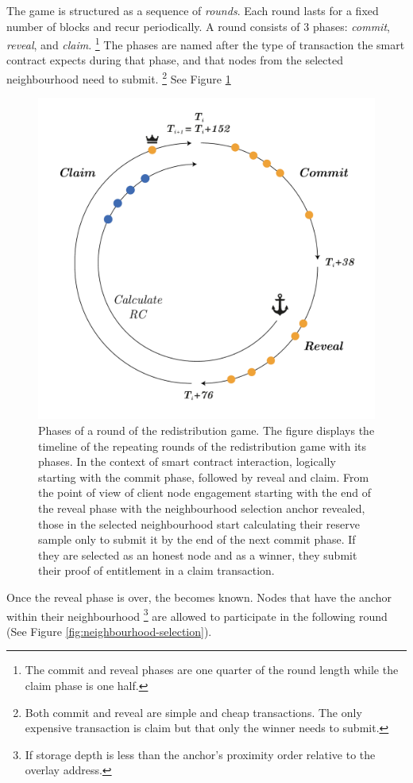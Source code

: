 The game is structured as a sequence of \emph{rounds}. Each round lasts for a fixed number of blocks and recur periodically. A round consists of 3 phases: \emph{commit}, \emph{reveal}, and \emph{claim}.%
%
\footnote{The commit and reveal phases are one quarter of the round length while the claim phase is one half.
}
%
The phases are named after the type of transaction the smart contract expects during that phase, and that nodes from the selected neighbourhood need to submit.%
%
\footnote{Both commit and reveal are simple and cheap transactions. The only expensive transaction is claim but that only the winner needs to submit.}
%
See Figure \ref{fig:phases}

\begin{figure}[!ht]
  \centering
    \includegraphics[width=.5\textwidth]{fig/round-lifecycle.pdf}
  \caption[Phases of a round of the redistribution game]{Phases of a round of the redistribution game. The figure displays the timeline of the repeating rounds of the redistribution game with its phases. In the context of smart contract interaction, logically starting with the commit phase, followed by reveal and claim. From the point of view of client node engagement starting with the end of the reveal phase with the neighbourhood selection anchor revealed, those in the selected neighbourhood start calculating their reserve sample only to submit it by the end of the next commit phase. If they are selected as an honest node and as a winner, they submit their proof of entitlement in a claim transaction.}
\label{fig:phases}
\end{figure}    

Once the reveal phase is over, the   becomes known. Nodes that have the anchor within their neighbourhood%
%
\footnote{If storage depth is less than the anchor's proximity order relative to the overlay address.}
%
are  allowed to participate in the following round (See Figure \ref{fig:neighbourhood-selection}).



